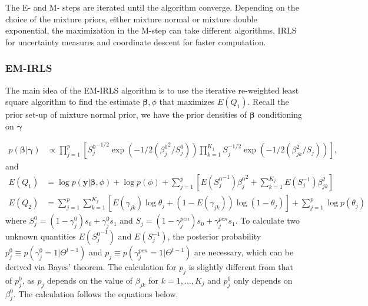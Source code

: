 \documentclass[AMA,STIX1COL,]{WileyNJD-v2}
\begin{document}
The E- and M- steps are iterated until the algorithm converge. Depending
on the choice of the mixture priors, either mixture normal or mixture
double exponential, the maximization in the M-step can take different
algorithms, IRLS for uncertainty measures and coordinate descent for
faster computation.

\hfill\break

\hypertarget{em-irls}{%
\subsubsection{EM-IRLS}\label{em-irls}}

The main idea of the EM-IRLS algorithm is to use the iterative
re-weighted least square algorithm to find the estimate
\(\boldsymbol{\beta}, \phi\) that maximizes \(E(Q_1)\). Recall the prior
set-up of mixture normal prior, we have the prior densities of
\(\boldsymbol{\beta}\) conditioning on \(\boldsymbol{\gamma}\)

\[
\begin{aligned}
p(\boldsymbol{\beta }| \boldsymbol{\gamma}) &\propto \prod\limits_{j=1}^{p}\left[{S^0_j}^{-1/2}\exp(-1/2({\beta^0_{j}}^2/S^0_{j}))\prod\limits_{k=1}^{K_j}S_{j}^{-1/2}\exp(-1/2(\beta_{jk}^2/S_{j}))\right],%
\end{aligned}
\] and \begin{align*}
E(Q_1) &= \log p(\textbf{y}|\boldsymbol{\beta}, \phi) + \log p(\phi) + \sum\limits_{j=1}^{p} \left[E({S^0_j}^{-1}){\beta^0_j}^2+\sum\limits_{k=1}^{K_j}E(S^{-1}_{j})\beta_{jk}^2\right]\\
E(Q_2) &= \sum\limits_{j=1}^{p}\sum\limits_{k=1}^{K_j} \left[ E(\gamma_{jk})\log \theta_j + (1-E(\gamma_{jk})) \log (1-\theta_j)\right] +  \sum\limits_{j=1}^{p}\log p(\theta_j)
\end{align*} where
\(S_{j}^0 = (1-\gamma^{0}_{j}) s_0 + \gamma^{0}_{j} s_1\) and
\(S_{j} = (1-\gamma^{pen}_{j}) s_0 + \gamma^{pen}_{j} s_1\). To
calculate two unknown quantities \(E({S_j^0}^{-1})\) and
\(E(S^{-1}_j)\), the posterior probability
\(p^0_{j} \equiv p(\gamma^{0}_{j}=1|\Theta^{t-1})\) and
\(p_{j} \equiv p(\gamma^{pen}_{j}=1|\Theta^{t-1})\) are necessary, which
can be derived via Bayes' theorem. The calculation for \(p_j\) is
slightly different from that of \(p^0_j\), as \(p_j\) depends on the
value of \(\beta_{jk}\) for \(k=1, \dots, K_j\) and \(p^0_j\) only
depends on \(\beta_j^0\). The calculation follows the equations below.
\end{document}
